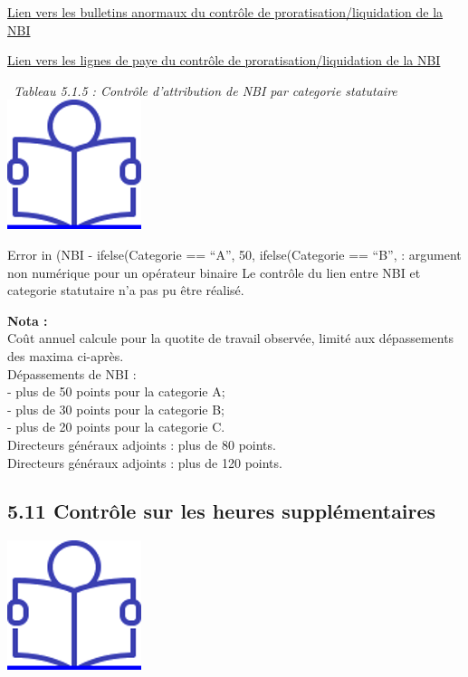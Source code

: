 \href{../Bases/Fiabilite/lignes.nbi.anormales.mensuel.csv}{Lien vers les
bulletins anormaux du contrôle de proratisation/liquidation de la NBI}

\href{../Bases/Fiabilite/lignes.paie.nbi.anormales.mensuel.csv}{Lien vers
les lignes de paye du contrôle de proratisation/liquidation de la NBI}

~\emph{Tableau 5.1.5 : Contrôle d'attribution de NBI par categorie
statutaire} ~
\href{../Docs/Notices/fiche_plafonds_NBI.odt}{\includegraphics{icones/Notice.png}}

Error in (NBI - ifelse(Categorie == ``A'', 50, ifelse(Categorie ==
``B'', : argument non numérique pour un opérateur binaire Le contrôle du
lien entre NBI et categorie statutaire n'a pas pu être réalisé.

\textbf{Nota :}\\
Coût annuel calcule pour la quotite de travail observée, limité aux
dépassements des maxima ci-après.\\
Dépassements de NBI :\\
- plus de 50 points pour la categorie A;\\
- plus de 30 points pour la categorie B;\\
- plus de 20 points pour la categorie C.\\
Directeurs généraux adjoints : plus de 80 points.\\
Directeurs généraux adjoints : plus de 120 points.

\hypertarget{controle-sur-les-heures-supplementaires}{%
\subsection{5.11 Contrôle sur les heures
supplémentaires}\label{controle-sur-les-heures-supplementaires}}

\href{../Docs/Notices/fiche_IHTS.odt}{\includegraphics{icones/Notice.png}}

